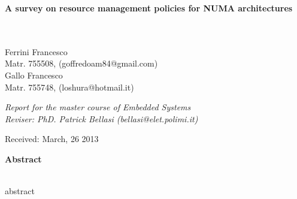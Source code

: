 \documentclass[a4paper,10pt]{article}
\newenvironment*{mytitle}{\begin{LARGE}\bf}{\end{LARGE}\\}%
\newenvironment*{myabstract}{\begin{Large}\bf}{\end{Large}\\[2.5ex]}%
\begin{document}
\begin{mytitle}A survey on resource management policies for NUMA architectures\end{mytitle}
%
%
\\
Ferrini Francesco\\
Matr. 755508, (goffredoam84@gmail.com)\\
\hspace{10ex}
Gallo Francesco\\
Matr. 755748, (loshura@hotmail.it)\\
\begin{flushright}
\emph{Report for the master course of Embedded Systems}\\
\emph{Reviser: PhD. Patrick Bellasi (bellasi@elet.polimi.it)}
\end{flushright}

Received: March, 26 2013\\
\hspace{10ex}

\begin{myabstract} Abstract \end{myabstract}
abstract
\end{document}
